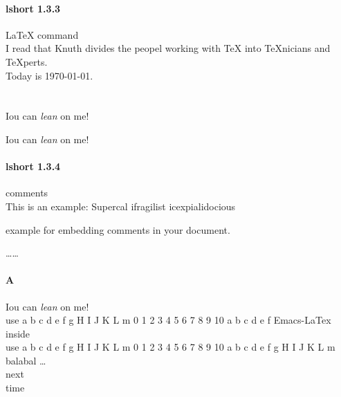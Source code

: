 \documentclass[a4paper,11pt]{book} %
\begin{document}
\paragraph{lshort 1.3.3} \LaTeX{} command
\\  %
I read that Knuth divides the peopel working with \TeX{} into \TeX{}nicians and
\TeX perts.
\\
Today is \today.
\\  %
\\  %
\\  %
Iou can \textsl{lean} on me!

Iou can \textsl{lean} on me!

\paragraph{lshort 1.3.4}comments
\\This is an %
example: Supercal%
                ifragilist%
        icexpialidocious
\begin{comment}
This is another
rather stupid,
but helpful
\end{comment}
example for embedding
comments in your document.

……

\paragraph{A}
Iou can \textsl{lean} on me!
\\%
use a b c d e f g H I J K L m 0 1 2 3 4 5 6 7 8 9 10 a b c d e f
\linebreak[3] Emacs-LaTex inside
\\
use a b c d e f g H I J K L m 0 1 2 3 4 5 6 7 8 9 10 a b c d e f g H I J K L m
\\
balabal \ldots{} %
\LaTeXe
\\
next
\\%
time
\end{document}
